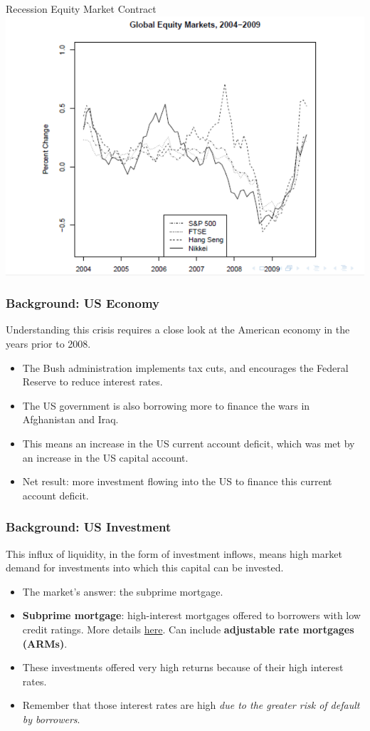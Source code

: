 \documentclass[handout]{beamer}
\begin{document}
\begin{frame}{\LARGE Recession Equity Market Contract}
	\centering
	\includegraphics[width=\textwidth,height=.8\textheight,keepaspectratio]{globalequity.png}
\end{frame}

\begin{frame} 
	\frametitle{\LARGE{Background: US Economy}}
	Understanding this crisis requires a close look at the American economy in the years prior to 2008. \pause
	\begin{itemize}
		\item The Bush administration implements tax cuts, and encourages the Federal Reserve to reduce interest rates. \pause
		\item The US government is also borrowing more to finance the wars in Afghanistan and  Iraq. \pause	
		\item This means an increase in the US current account deficit, which was met by an increase in the US capital account. \pause
		\item Net result: more investment flowing into the US to finance this current account deficit.
	\end{itemize}
\end{frame}

\begin{frame} 
	\frametitle{\LARGE{Background: US Investment}}
	This influx of liquidity, in the form of investment inflows, means high market demand for investments into which this capital can be invested. \pause
	\begin{itemize}
		\item The market's answer: the subprime mortgage. \pause
		\item \textbf{Subprime mortgage}: high-interest mortgages offered to borrowers with low credit ratings. More details \href{https://www.investopedia.com/terms/s/subprime_mortgage.asp}{here}. Can include \textbf{adjustable rate mortgages (ARMs)}. \pause	
		\item These investments offered very high returns because of their high interest rates. \pause
		\item Remember that those interest rates are high \textit{due to the greater risk of default by borrowers}.
	\end{itemize}
\end{frame}
\end{document}
